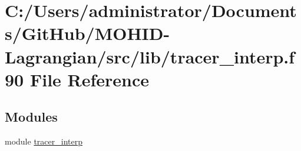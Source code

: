 \hypertarget{tracer__interp_8f90}{}\section{C\+:/\+Users/administrator/\+Documents/\+Git\+Hub/\+M\+O\+H\+I\+D-\/\+Lagrangian/src/lib/tracer\+\_\+interp.f90 File Reference}
\label{tracer__interp_8f90}
\subsection*{Modules}
\begin{DoxyCompactItemize}
\item 
module \hyperlink{namespacetracer__interp}{tracer\+\_\+interp}
\end{DoxyCompactItemize}
